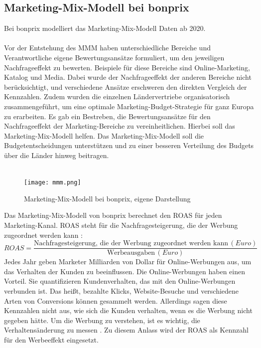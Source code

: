 \subsection{Marketing-Mix-Modell bei bonprix} 
\label{Marketing-Mix-ModellBeiBonprix}
Bei bonprix modelliert das Marketing-Mix-Modell Daten ab 2020. \\\\
Vor der Entstehung des \ac{MMM} haben unterschiedliche Bereiche und Verantwortliche eigene Bewertungsansätze formuliert, um den jeweiligen Nachfrageeffekt zu bewerten. Beispiele für diese Bereiche sind Online-Marketing, Katalog und Media. Dabei wurde der Nachfrageeffekt der anderen Bereiche nicht berücksichtigt, und verschiedene Ansätze erschweren den direkten Vergleich der Kennzahlen. Zudem wurden die einzelnen Ländervertriebe organisatorisch zusammengeführt, um eine optimale Marketing-Budget-Strategie für ganz Europa zu erarbeiten. Es gab ein Bestreben, die Bewertungsansätze für den Nachfrageeffekt der Marketing-Bereiche zu vereinheitlichen. Hierbei soll das Marketing-Mix-Modell helfen. Das Marketing-Mix-Modell soll die Budgetentscheidungen unterstützen und zu einer besseren Verteilung des Budgets über die Länder hinweg beitragen.\\\\
\begin{figure}[H]
    \centering
    \texttt{[image: mmm.png]}
    \caption{Marketing-Mix-Modell bei bonprix, eigene Darstellung}
    \label{fig:mmmbonprix}
\end{figure}
Das Marketing-Mix-Modell von bonprix berechnet den \ac{ROAS} für jeden Marketing-Kanal. \ac{ROAS} steht für die Nachfragesteigerung, die der Werbung zugeordnet werden kann \cite{roas}:
\begin{equation}
ROAS = \frac{\text{Nachfragesteigerung, die der Werbung zugeordnet werden kann} \, (Euro)}{\text{Werbeausgaben} \, (Euro)}
\end{equation}
Jedes Jahr geben Marketer Milliarden von Dollar für Online-Werbungen aus, um das Verhalten der Kunden zu beeinflussen. Die Online-Werbungen haben einen Vorteil. Sie quantifizieren Kundenverhalten, das mit den Online-Werbungen verbunden ist. Das heißt, bezahlte Klicks, Website-Besuche und verschiedene Arten von Conversions können gesammelt werden. Allerdings sagen diese Kennzahlen nicht aus, wie sich die Kunden verhalten, wenn es die Werbung nicht gegeben hätte. Um die Werbung zu verstehen, ist es wichtig, die Verhaltensänderung zu messen \cite{roas}. Zu diesem Anlass wird der ROAS als Kennzahl für den Werbeeffekt eingesetzt. \\\\
